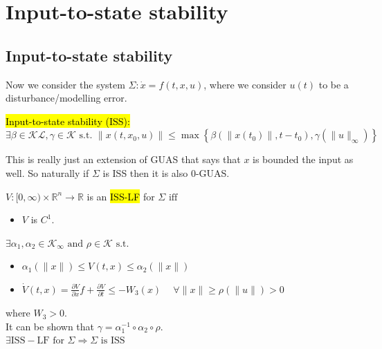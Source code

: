 \section{Input-to-state stability}
\subsection{Input-to-state stability}
Now we consider the system $\Sigma: \dot{x}=f(t, x, u)$, where we consider $u(t)$ to be a disturbance/modelling error.

\begin{definition}
    \hl{Input-to-state stability (ISS):} $\exists \beta \in \mathscr{K} \mathscr{L}, \gamma \in \mathscr{K} \text { s.t. } \left\|x\left(t, x_{0}, u\right)\right\| \leq \max \left\{\beta\left(\left\|x\left(t_{0}\right)\right\|, t-t_{0}\right), \gamma\left(\|u\|_{\infty}\right)\right\}$
\end{definition}
\begin{remark}
    This is really just an extension of GUAS that says that $x$ is bounded the input as well. So naturally if $\Sigma$ is ISS then it is also 0-GUAS.
\end{remark}

\begin{tcolorbox}[colback=white, colframe=teal]
\begin{definition}
    $V:[0, \infty) \times \mathbb{R}^{n} \rightarrow \mathbb{R}$ is an \hl{ISS-LF} for $\Sigma \text { iff }$
    \begin{itemize}[topsep=0pt]
        \item $V$ is $C^1$.
    \end{itemize}
    $\exists \alpha_{1}, \alpha_{2} \in \mathscr{K}_{\infty} \text { and } \rho \in \mathscr{K} \text { s.t. }$
    \begin{itemize}[topsep=0pt]
        \item $\alpha_{1}(\|x\|) \leq V(t, x) \leq \alpha_{2}(\|x\|)$
        \item $\dot{V}(t, x)=\frac{\partial V}{\partial x} f+\frac{\partial V}{\partial t} \leq-W_{3}(x) \quad\ \forall \|x\| \geq \rho(\|u\|)>0$
    \end{itemize}
    where $W_3 > 0$.\\
    It can be shown that $\gamma=\alpha_{1}^{-1} \circ \alpha_{2} \circ \rho$.\\
    $\exists \mathrm{ISS}-\mathrm{LF} \text { for } \Sigma \Rightarrow \Sigma \text { is } \mathrm{ISS}$
\end{definition}
\end{tcolorbox}

